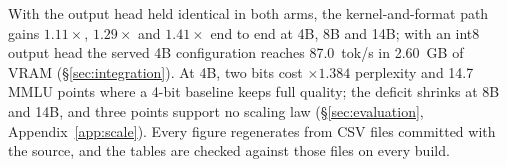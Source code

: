 With the output head held identical in both arms, the kernel-and-format
path gains $1.11\times$, $1.29\times$ and $1.41\times$ end to end at 4B,
8B and 14B; with an int8 output head the served 4B configuration reaches
87.0~tok/s in 2.60~GB of VRAM (\S\ref{sec:integration}). At 4B, two bits cost $\times1.384$ perplexity
and 14.7 MMLU points where a 4-bit baseline keeps full quality; the deficit
shrinks at 8B and 14B, and three points support no scaling law
(\S\ref{sec:evaluation}, Appendix~\ref{app:scale}). Every figure
regenerates from CSV files committed with the source, and the tables are
checked against those files on every build.
